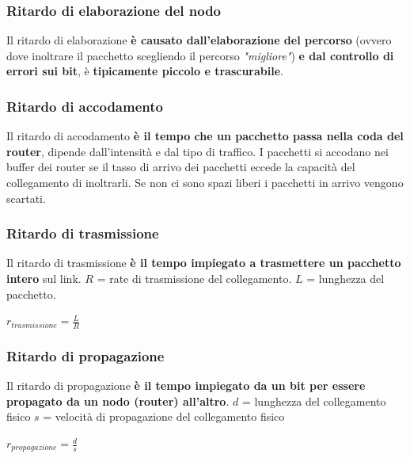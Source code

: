 \documentclass[11pt,a4paper,oneside]{book}
\theoremstyle{definition}
\begin{document}
\subsubsection{Ritardo di elaborazione del nodo}
Il ritardo di elaborazione \textbf{è causato dall'elaborazione del percorso} (ovvero dove inoltrare il pacchetto scegliendo il percorso \textit{"migliore"}) \textbf{e dal controllo di errori sui bit}, è \textbf{tipicamente piccolo e trascurabile}.

\subsubsection{Ritardo di accodamento}
Il ritardo di accodamento \textbf{è il tempo che un pacchetto passa nella coda del router}, dipende dall'intensità e dal tipo di traffico. I pacchetti si accodano nei buffer dei router se il tasso di arrivo dei pacchetti eccede la capacità del collegamento di inoltrarli. Se non ci sono spazi liberi i pacchetti in arrivo vengono scartati.

\subsubsection{Ritardo di trasmissione}
Il ritardo di trasmissione \textbf{è il tempo impiegato a trasmettere un pacchetto intero} sul link.\newline
$R$ = rate di trasmissione del collegamento.\newline
$L$ = lunghezza del pacchetto.\newline

{\centering$r_{trasmissione} = \frac{L}{R}$ \par}

\subsubsection{Ritardo di propagazione}
Il ritardo di propagazione \textbf{è il tempo impiegato da un bit per essere propagato da un nodo (router) all'altro}.\newline
$d$ = lunghezza del collegamento fisico\newline
$s$ = velocità di propagazione del collegamento fisico \newline

{\centering$r_{propagazione} = \frac{d}{s}$ \par}
\end{document}
